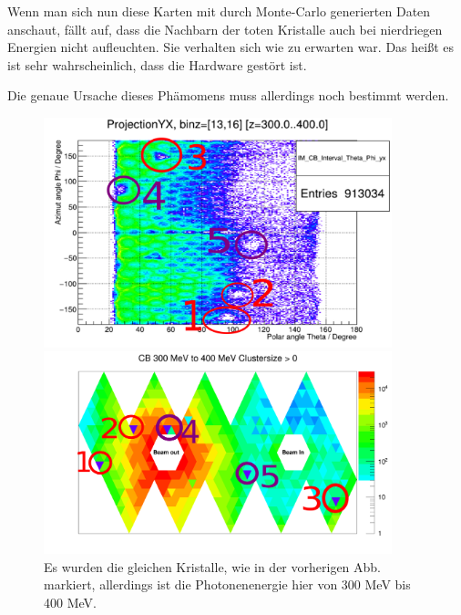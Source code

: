 \documentclass[a4paper,11pt,oneside,final,german,openbib,pdftex]{scrbook}
\begin{document}
{Wenn man sich nun diese Karten mit durch Monte-Carlo generierten Daten anschaut, f\"allt auf, dass die Nachbarn der toten Kristalle auch bei nierdriegen Energien nicht aufleuchten. Sie verhalten sich wie zu erwarten war. Das hei{\ss}t es ist sehr wahrscheinlich, dass die Hardware gest\"ort ist. 

Die genaue Ursache dieses Ph\"amomens muss allerdings noch bestimmt werden.




\begin{figure}[h!]
	\centering
	\begin{minipage}{0.45\textwidth}
		\centering
		\includegraphics[width=0.9\textwidth]{NewCalib/Strahlzeit2014/ClusterSize/20172104StrahlzeitDeadCrystalMarked}
		
	\end{minipage}
	\hfill
	\begin{minipage}{0.45\textwidth}
		\centering
		\includegraphics[width=0.9\textwidth]{NewCalib/Strahlzeit2014/ClusterSizeNew/20172404Clustersize0Map400MeV}
	\end{minipage}
	\caption[Strahlzeit: Symmetrische Photonen; Markierte Dead-Crystals; Hohe Energien]{ Es wurden die gleichen Kristalle, wie in der vorherigen Abb. markiert, allerdings ist die Photonenenergie hier von 300 MeV bis 400 MeV.}
	

\end{figure}}
\end{document}
